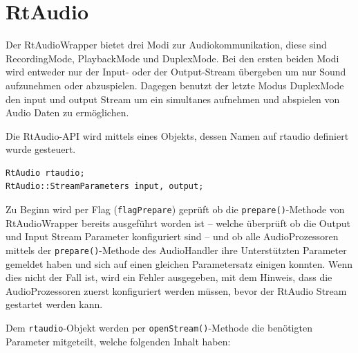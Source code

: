 \section{RtAudio}

Der RtAudioWrapper bietet drei Modi zur Audiokommunikation, diese sind RecordingMode, PlaybackMode und DuplexMode. Bei den ersten beiden Modi wird entweder nur der Input- oder der Output-Stream übergeben um nur Sound aufzunehmen oder abzuspielen. Dagegen benutzt der letzte Modus DuplexMode den input und output Stream um ein simultanes aufnehmen und abspielen von Audio Daten zu ermöglichen.

Die RtAudio-API wird mittels eines Objekts, dessen Namen auf rtaudio definiert wurde gesteuert.

\begin{lstlisting}[caption={RtAudio Objekt und StreamParameter},label={Code:RtAudio}]
RtAudio rtaudio;
RtAudio::StreamParameters input, output;
\end{lstlisting}

Zu Beginn wird per Flag (\texttt{flagPrepare}) geprüft ob die \texttt{prepare()}-Methode von RtAudioWrapper bereits ausgeführt worden ist -- welche überprüft ob die Output und Input Stream Parameter konfiguriert sind -- und ob alle AudioProzessoren mittels der \texttt{prepare()}-Methode des AudioHandler ihre Unterstützten Parameter gemeldet haben und sich auf einen gleichen Parametersatz einigen konnten. Wenn dies nicht der Fall ist, wird ein Fehler ausgegeben, mit dem Hinweis, dass die AudioProzessoren zuerst konfiguriert werden müssen, bevor der RtAudio Stream gestartet werden kann.

Dem \texttt{rtaudio}-Objekt werden per \texttt{openStream()}-Methode die benötigten Parameter mitgeteilt, welche folgenden Inhalt haben:


